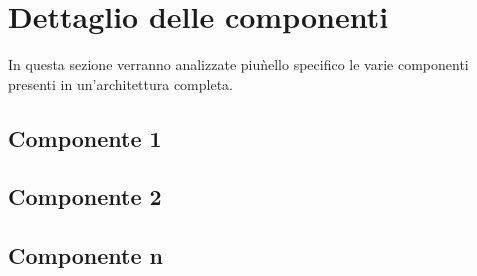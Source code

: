 \section{Dettaglio delle componenti}

In questa sezione verranno analizzate piu\` nello specifico le varie componenti presenti in un'architettura completa.

\subsection{Componente 1}

\subsection{Componente 2}

\subsection{Componente n}
